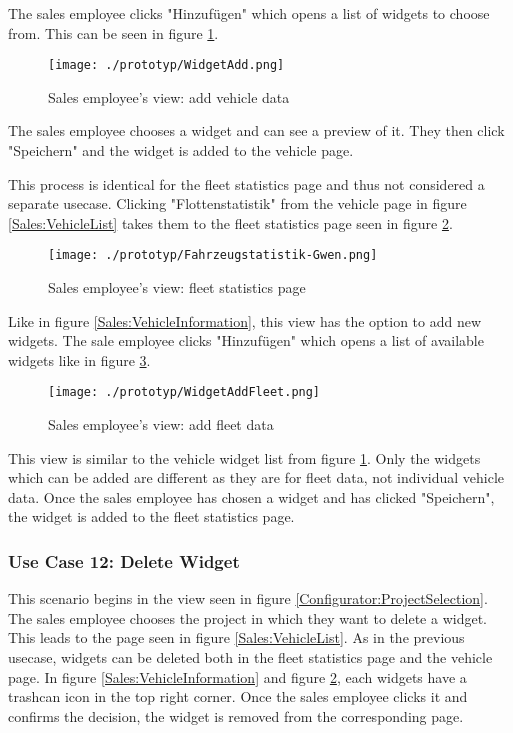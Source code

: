 The sales employee clicks "Hinzufügen" which opens a list of \glspl{widget} to choose from. This can be seen in figure \ref{Sales:AddWidget}.

\begin{figure}[ht]
  \centering
  \texttt{[image: ./prototyp/WidgetAdd.png]}
  \caption{Sales employee's view: add vehicle \gls{data}}
  \label{Sales:AddWidget}
\end{figure}

The sales employee chooses a \gls{widget} and can see a preview of it. They then click "Speichern" and the \gls{widget} is added to the vehicle page.

This process is identical for the fleet statistics page and thus not considered a separate \gls{usecase}. Clicking "Flottenstatistik" from the vehicle page in figure \ref{Sales:VehicleList} takes them to the fleet statistics page seen in figure \ref{Sales:Fleet}.

\begin{figure}[ht]
  \centering
  \texttt{[image: ./prototyp/Fahrzeugstatistik-Gwen.png]}
  \caption{Sales employee's view: fleet statistics page}
  \label{Sales:Fleet}
\end{figure}

Like in figure \ref{Sales:VehicleInformation}, this view has the option to add new \glspl{widget}. The sale employee clicks "Hinzufügen" which opens a list of available \glspl{widget} like in figure \ref{Sales:FleetWidget}.

\begin{figure}[ht]
  \centering
  \texttt{[image: ./prototyp/WidgetAddFleet.png]}
  \caption{Sales employee's view: add fleet \gls{data}}
  \label{Sales:FleetWidget}
\end{figure}

This view is similar to the vehicle \gls{widget} list from figure \ref{Sales:AddWidget}. Only the \glspl{widget} which can be added are different as they are for fleet data, not individual vehicle data. Once the sales employee has chosen a \gls{widget} and has clicked "Speichern", the \gls{widget} is added to the fleet statistics page.


\subsubsection{Use Case 12: Delete Widget}

This scenario begins in the view seen in figure \ref{Configurator:ProjectSelection}. The sales employee chooses the project in which they want to delete a widget. This leads to the page seen in figure \ref{Sales:VehicleList}. As in the previous \gls{usecase}, \glspl{widget} can be deleted both in the fleet statistics page and the vehicle page. In figure \ref{Sales:VehicleInformation} and figure \ref{Sales:Fleet}, each \glspl{widget} have a trashcan icon in the top right corner. Once the sales employee clicks it and confirms the decision, the \gls{widget} is removed from the corresponding page.


